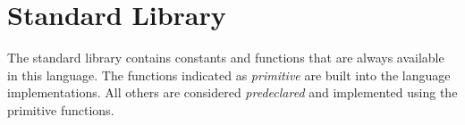 \section{Standard Library}

The standard library contains constants and functions
that are always available in this language.
The functions indicated as \emph{primitive} are built into the
language implementations. All others are considered
\emph{predeclared} and implemented using the primitive functions.
